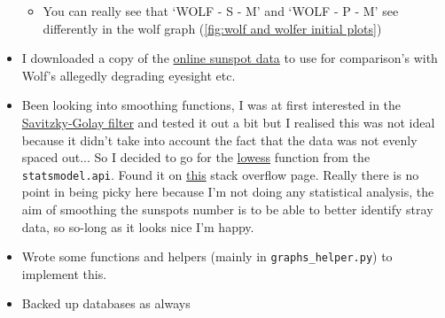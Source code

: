 \documentclass[12pt]{article}
\begin{document}
\begin{itemize}
\begin{itemize}
        \item You can really see that `WOLF - S - M' and `WOLF - P - M' see differently in the wolf graph (\ref{fig:wolf and wolfer initial plots})
    \end{itemize}
    \item I downloaded a copy of the \href{http://www.sidc.be/silso/datafiles}{online sunspot data} to use for comparison's with Wolf's allegedly degrading eyesight etc.
    \item Been looking into smoothing functions, I was at first interested in the \href{https://en.wikipedia.org/wiki/Savitzky-Golay_filter}{Savitzky-Golay filter} and tested it out a bit but I realised this was not ideal because it didn't take into account the fact that the data was not evenly spaced out... So I decided to go for the \href{https://www.statsmodels.org/dev/generated/statsmodels.nonparametric.smoothers_lowess.lowess.html}{lowess} function from the \texttt{statsmodel.api}. Found it on \href{https://stackoverflow.com/questions/28536191/how-to-filter-smooth-with-scipy-numpy#28541805}{this} stack overflow page. Really there is no point in being picky here because I'm not doing any statistical analysis, the aim of smoothing the sunspots number is to be able to better identify stray data, so so-long as it looks nice I'm happy.
    \item Wrote some functions and helpers (mainly in \texttt{graphs\_helper.py}) to implement this.
    \item Backed up databases as always
\end{itemize}
\end{document}
